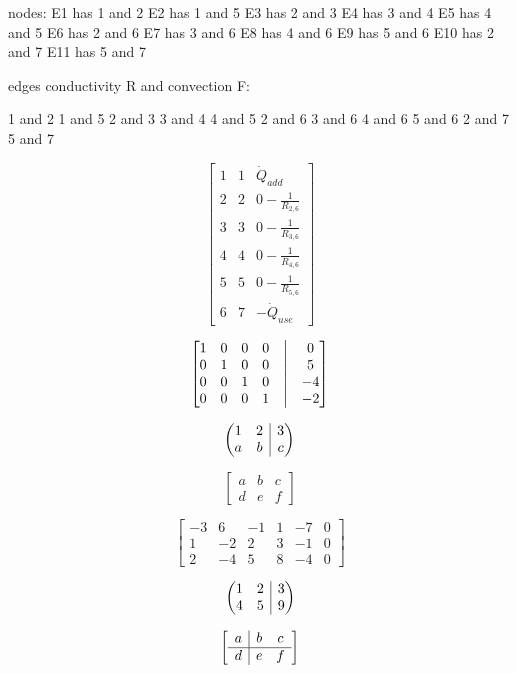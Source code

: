 	
nodes:
E1 has 1 and 2
E2 has 1 and 5
E3 has 2 and 3
E4 has 3 and 4
E5 has 4 and 5
E6 has 2 and 6
E7 has 3 and 6
E8 has 4 and 6
E9 has 5 and 6
E10 has 2 and 7
E11 has 5 and 7

edges conductivity R and convection F:

1 and 2
1 and 5
2 and 3
3 and 4
4 and 5
2 and 6
3 and 6
4 and 6
5 and 6
2 and 7
5 and 7

\[
\begin{bmatrix}
	1 & 1 & \dot{Q}_{add}\\
	2 & 2 & 0 - \frac{1}{R_{2,6}}\\
	3 & 3 & 0 - \frac{1}{R_{3,6}}\\
	4 & 4 & 0 - \frac{1}{R_{4,6}}\\
	5 & 5 & 0 - \frac{1}{R_{5,6}}\\
	6 & 7 & -\dot{Q}_{use}
\end{bmatrix}
\]

$$
\begin{bmatrix}
	1 & 0 & 0 & 0 &\bigm| & 0 \\
	0 & 1 & 0 & 0 &\bigm| & 5 \\
	0 & 0 & 1 & 0 &\bigm| & -4 \\ 
	0 & 0 & 0 & 1 &\bigm| & -2
\end{bmatrix}
$$

\newenvironment{amatrix}[1]{%
	\left(\begin{array}{@{}*{#1}{c}|c@{}}
	}{%
	\end{array}\right)
}

\[
\begin{amatrix}{2}
	1 & 2 & 3 \\  a & b & c
\end{amatrix}
\]

\[
\left[
\begin{array}{cc|c}
	a & b & c \\
	d & e & f
\end{array}
\right]
\]

\[
\left[\begin{array}{rrrrr|r}
	-3 & 6 & -1 & 1 & -7 & 0\\
	1 & -2 & 2 & 3 & -1 & 0\\
	2 & -4 & 5 & 8 & -4 & 0
\end{array}\right]
\]

\[
\left(\hspace{-5pt}\begin{array}{cc|c}
	1 & 2 & 3 \\
	4 & 5 & 9
\end{array}\hspace{-5pt}\right)
\]

\[
    \left[\begin{array}{c|c c} 
	a & b & c\\ 
	\hline 
	d & e & f 
\end{array}\right] 
\]
\newpage